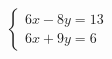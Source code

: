 \documentclass[preview]{standalone}
\begin{document}
\begin{align*}
\left\{ \begin{array}{rcl} 6x - 8y  =  13 \\ 6x + 9y = 6 \end{array} \right.
\end{align*}
\end{document}
